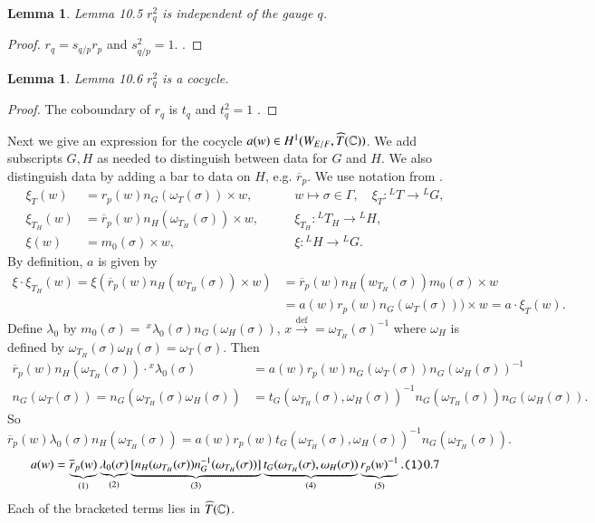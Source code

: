 \documentclass[11pt]{amsart}
\theoremstyle{plain}
\newtheorem{lemma}[theorem]{Lemma}
\theoremstyle{definition}
\def\taglet#1{\text{\tt (#1)}}
\def\Com{{\Bbb C}}                         %
\def\Def{\overset{\operatorname{def}}\to=}   %
\def\LANGLANDSO{21}
\begin{document}
\begin{lemma}{Lemma 10.5} $r_q^2$ is independent of the gauge $q$.
\end{lemma}

\begin{proof}  $r_q = s_{q/p}r_p$ and $s_{q/p}^2 = 1$.
\cite{\LANGLANDSO, 2.4}.
\end{proof}

\begin{lemma}{Lemma 10.6}  $r_q^2$ is a cocycle.
\end{lemma}

\begin{proof}  The coboundary of $r_q$ is
$t_q$ and $t_q^2 = 1$ \cite{\LANGLANDSO,2.1.B,2.5.A}.
\end{proof}

Next we give an expression for the cocycle
$a(w) \in H^1(W_{E/F},\widehat T(\Com))$.
We add subscripts $G,H$ as needed to distinguish between
data for $G$  and $H$.  We also distinguish data by adding
a bar to data on $H$, e.g. $\overline r_p$. We use notation from \cite{\LANGLANDSO}.
$$
\begin{array}{lll}
\xi_T(w) &= r_p(w)n_G(\omega_T(\sigma))\times w,
     &\qquad w\mapsto \sigma\in \Gamma,\quad\xi_T:{}^LT\to {}^LG,\\
\xi_{T_H}(w) &=\overline r_p(w)n_H(\omega_{T_H}(\sigma))\times w,
	&\qquad \xi_{T_H}:{}^L{T_H}\to {}^LH,\\
\xi(w) &=m_0(\sigma)\times w, &\qquad \xi:{}^LH\to {}^LG.
\end{array}
$$
By definition, $a$ is given by
$$
\begin{array}{lll}
\xi\cdot\xi_{T_H}(w) =
\xi(\overline r_p(w)n_H(w_{T_H}(\sigma))\times w)
&=\overline r_p(w)n_H(w_{T_H}(\sigma))m_0(\sigma)\times w\\
&=a(w)r_p(w)n_G(\omega_T(\sigma)))\times w = a\cdot\xi_T(w).
\end{array}
$$
Define $\lambda_0$ by\quad
$m_0(\sigma)=\ {}^x\lambda_0(\sigma)n_G(\omega_H(\sigma))$, $x\Def \omega_{T_H}(\sigma)^{-1}$
where $\omega_H$ is defined by
$\omega_{T_H}(\sigma)\omega_H(\sigma)=
\omega_T(\sigma)$.
Then
$$
\begin{array}{lll}
\overline r_p(w)n_H(\omega_{T_H}(\sigma))\cdot{}^x\lambda_0(\sigma)
&=a(w)r_p(w)n_G(\omega_T(\sigma))n_G(\omega_H(\sigma))^{-1}\\
n_G(\omega_T(\sigma)) =n_G(\omega_{T_H}(\sigma)
\omega_H(\sigma)) &=
t_G(\omega_{T_H}(\sigma),\omega_H(\sigma))^{-1}
n_G(\omega_{T_H}(\sigma))n_G(\omega_H(\sigma)).
\end{array}
$$
So
$$
\overline r_p(w)\lambda_0(\sigma)n_H(\omega_{T_H}(\sigma))
= a(w)r_p(w)t_G(\omega_{T_H}(\sigma),
\omega_H(\sigma))^{-1}n_G(\omega_{T_H}(\sigma)).
$$
$$
a(w) =
\underbrace{\overline r_p(w)}_{\text{(1)}}
\underbrace{\lambda_0(\sigma)}_{\text{(2)}}
\underbrace{[n_H(\omega_{T_H}(\sigma))n_G^{-1}(\omega_{T_H}(\sigma))]}_{
\text{(3)}}
\underbrace{t_G(\omega_{T_H}(\sigma),\omega_H(\sigma))}_{\text{(4)}}
\underbrace{r_p(w)^{-1}}_{\text{(5)}}.
\taglet10.7
$$
Each of the bracketed terms lies in $\widehat T(\Com)$.
\end{document}
